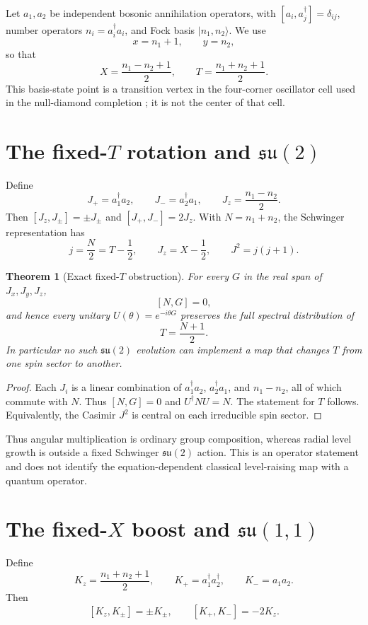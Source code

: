 \documentclass[11pt]{amsart}
\newtheorem{theorem}{Theorem}[section]
\theoremstyle{remark}
\begin{document}
Let $a_1,a_2$ be independent bosonic annihilation operators, with $[a_i,a_j^\dagger]=\delta_{ij}$, number operators $n_i=a_i^\dagger a_i$, and Fock basis $|n_1,n_2\rangle$.  We use
\begin{equation}\label{eq:dictionary}
x=n_1+1,\qquad y=n_2,
\end{equation}
so that
\[
X=\frac{n_1-n_2+1}{2},\qquad T=\frac{n_1+n_2+1}{2}.
\]
This basis-state point is a transition vertex in the four-corner oscillator cell used in the null-diamond completion \cite{Ebert2026NullDiamond}; it is not the center of that cell.

\section{The fixed-$T$ rotation and $\mathfrak{su}(2)$}
Define
\[
J_+=a_1^\dagger a_2,\qquad J_-=a_2^\dagger a_1,\qquad J_z=\frac{n_1-n_2}{2}.
\]
Then $[J_z,J_\pm]=\pm J_\pm$ and $[J_+,J_-]=2J_z$.  With $N=n_1+n_2$, the Schwinger representation has
\[
j=\frac N2=T-\frac12,\qquad J_z=X-\frac12,\qquad J^2=j(j+1).
\]

\begin{theorem}[Exact fixed-$T$ obstruction]\label{thm:su2}
For every $G$ in the real span of $J_x,J_y,J_z$,
\[
[N,G]=0,
\]
and hence every unitary $U(\theta)=e^{-i\theta G}$ preserves the full spectral distribution of
\[
T=\frac{N+1}{2}.
\]
In particular no such $\mathfrak{su}(2)$ evolution can implement a map that changes $T$ from one spin sector to another.
\end{theorem}
\begin{proof}
Each $J_i$ is a linear combination of $a_1^\dagger a_2$, $a_2^\dagger a_1$, and $n_1-n_2$, all of which commute with $N$.  Thus $[N,G]=0$ and $U^\dagger N U=N$.  The statement for $T$ follows.  Equivalently, the Casimir $J^2$ is central on each irreducible spin sector.
\end{proof}

Thus angular multiplication is ordinary group composition, whereas radial level growth is outside a fixed Schwinger $\mathfrak{su}(2)$ action.  This is an operator statement and does not identify the equation-dependent classical level-raising map with a quantum operator.

\section{The fixed-$X$ boost and $\mathfrak{su}(1,1)$}
Define
\[
K_z=\frac{n_1+n_2+1}{2},\qquad K_+=a_1^\dagger a_2^\dagger,\qquad K_-=a_1a_2.
\]
Then
\[
[K_z,K_\pm]=\pm K_\pm,\qquad [K_+,K_-]=-2K_z.
\]
\end{document}
